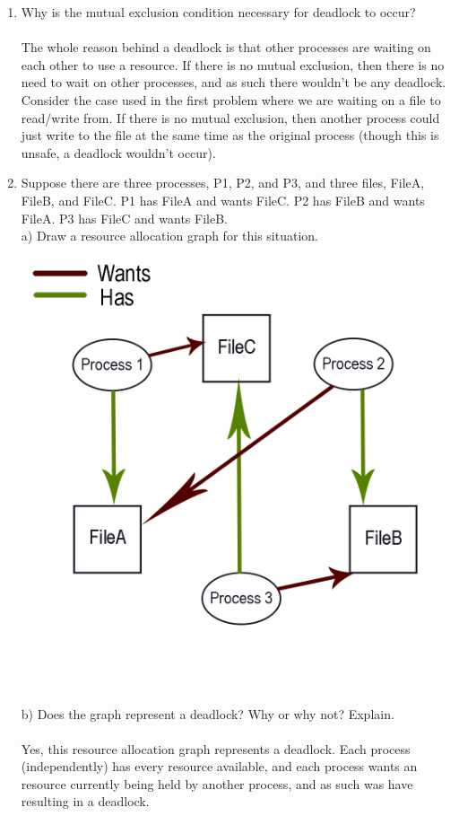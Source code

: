 \documentclass[12pt]{article}
\begin{document}
\begin{enumerate}
   \item Why is the mutual exclusion condition necessary for deadlock to occur? \\ \\
   The whole reason behind a deadlock is that other processes are waiting on each other to use a resource. If there is no mutual exclusion, then there is no need to wait on other processes, and as such there wouldn't be any deadlock. Consider the case used in the first problem where we are waiting on a file to read/write from. If there is no mutual exclusion, then another process could just write to the file at the same time as the original process (though this is unsafe, a deadlock wouldn't occur). 
   
   \item Suppose there are three processes, P1, P2, and P3, and three files, FileA, FileB, and FileC. P1 has FileA and wants FileC.  P2 has FileB and wants FileA.  P3 has FileC and wants FileB.  \\
   a) Draw a resource allocation graph for this situation.
   \begin{center}
   	\includegraphics[scale=0.35]{dependency}
   \end{center}
   b) Does the graph represent a deadlock?  Why or why not? Explain.\\ \\
   Yes, this resource allocation graph represents a deadlock. Each process (independently) has every resource available, and each process wants an resource currently being held by another process, and as such was have resulting in a deadlock.
   

\end{enumerate}
\end{document}
